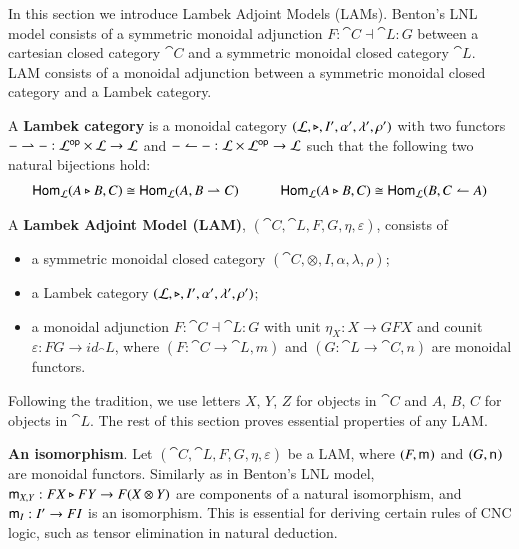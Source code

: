 In this section we introduce Lambek Adjoint Models (LAMs). Benton's
LNL model consists of a symmetric monoidal adjunction
$F:\cat{C}\dashv\cat{L}:G$ between a cartesian closed category
$\cat{C}$ and a symmetric monoidal closed category $\cat{L}$. LAM
consists of a monoidal adjunction between a symmetric monoidal closed
category and a Lambek category.
\begin{definition}
  \label{def:lambek-category}
  A \textbf{Lambek category} is a monoidal category $(\mathcal{L},\triangleright,I',\alpha',\lambda',\rho')$
  with two functors $- \rightharpoonup - : \mathcal{L}^{\mathsf{op}} \times \mathcal{L} \rightarrow \mathcal{L}$ and
  $- \leftharpoonup - : \mathcal{L} \times \mathcal{L}^{\mathsf{op}} \rightarrow \mathcal{L}$ such that the following
  two natural bijections hold:
  \[
  \begin{array}{lllll}
    \mathsf{Hom}_{\mathcal{L}}(A \triangleright B,C) \cong \mathsf{Hom}_{\mathcal{L}}(A,B \rightharpoonup C) & \quad &
    \mathsf{Hom}_{\mathcal{L}}(A \triangleright B,C) \cong \mathsf{Hom}_{\mathcal{L}}(B,C \leftharpoonup A)\\
  \end{array}
  \]  
\end{definition}

\begin{definition}
  A \textbf{Lambek Adjoint Model (LAM)}, $(\cat{C},\cat{L},F,G,\eta,\varepsilon)$, consists of
  \begin{itemize}
  \item a symmetric monoidal closed category $(\cat{C},\otimes,I,\alpha,\lambda,\rho)$;
  \item a Lambek category $(\mathcal{L},\triangleright,I',\alpha',\lambda',\rho')$;
  \item a monoidal adjunction $F:\cat{C}\dashv\cat{L}:G$ with unit $\eta_X:X\rightarrow GFX$ and
        counit $\varepsilon:FG\rightarrow id_\cat{L}$, where $(F:\cat{C}\rightarrow\cat{L}, m)$
        and $(G:\cat{L}\rightarrow\cat{C}, n)$ are monoidal functors.
  \end{itemize}
\end{definition}
\noindent
Following the tradition, we use letters $X$, $Y$, $Z$ for objects in
$\cat{C}$ and $A$, $B$, $C$ for objects in $\cat{L}$. The rest of this
section proves essential properties of any LAM.

\textbf{An isomorphism}. Let $(\cat{C},\cat{L},F,G,\eta,\varepsilon)$
be a LAM, where $(F,\mathsf{m}_{})$ and $(G,\mathsf{n}_{})$ are monoidal
functors. Similarly as in Benton's LNL model, $\mathsf{m}_{X,Y} : FX \triangleright FY
\rightarrow F(X \otimes Y)$ are components of a natural isomorphism, and
$\mathsf{m}_{I} : I' \rightarrow FI$ is an isomorphism. This is essential for deriving certain
rules of CNC logic, such as tensor elimination in natural deduction.

